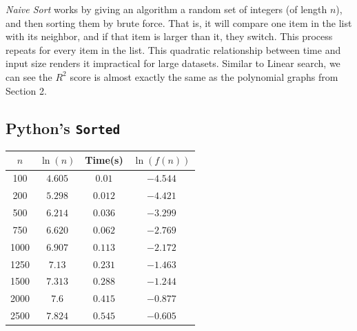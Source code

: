 \documentclass{article}
\begin{document}
        \textit{Naive Sort} works by giving an algorithm a random set of integers (of length $n$), and then sorting them by brute force. That is, it will compare one item in the list with its neighbor, and if that item is larger than it, they switch. This process repeats for every item in the list. This quadratic relationship between time and input size renders it impractical for large datasets. Similar to Linear search, we can see the $R^2$ score is almost exactly the same as the polynomial graphs from Section 2.

    \subsection{Python's \texttt{Sorted}}



    \begin{minipage}{0.4\textwidth} %
    \centering
    
    \begin{tabular}{c|c|c|c}
        $n$ & $\ln(n)$ & Time(s) & $\ln(f(n))$ \\ \hline
        100 & $4.605$ & $0.01$ & $-4.544$ \\\hline
        200 & $5.298$ & $0.012$ & $-4.421$  \\\hline
        500 & $6.214$ & $0.036$ & $-3.299$\\\hline
        750 & $6.620$ & $0.062$ & $-2.769$\\\hline
        1000 & $6.907$ & $0.113$ & $-2.172$\\ \hline
        1250 & $7.13$ & $0.231$ & $-1.463$\\ \hline
        1500 & $7.313$ & $0.288$  & $-1.244$\\ \hline
        2000 & $7.6$ & $0.415$ & $-0.877$\\ \hline
        2500 & $7.824$ & $0.545$ & $-0.605$\\
    \end{tabular}

    
    
\end{minipage}%
\end{document}
